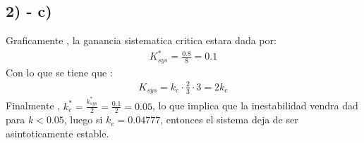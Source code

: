 \documentclass[
  11pt,
  letterpaper,
   addpoints,
  ]{exam}
\begin{document}
\begin{questions}
\begin{solution}
\subsection*{2) - c)}
Graficamente , la ganancia sistematica critica estara dada por:
\begin{align}
    K^{*}_{sys} = \frac{0.8}{8} = 0.1  
\end{align}
Con lo que se tiene que :
\begin{align}
    K_{sys} = k_{e} \cdot \frac{2}{3} \cdot 3 = 2k_{e}
\end{align}
Finalmente , $k^{*}_{e} =\frac{k^{*}_{sys}}{2} = \frac{0.1}{2} = 0.05$, lo que implica que la inestabilidad vendra dad para $k<0.05$, luego si $k_{e} = 0.04777$, entonces el sistema deja de ser asintoticamente estable.
\end{solution}


\end{questions}
\newpage
\end{document}
